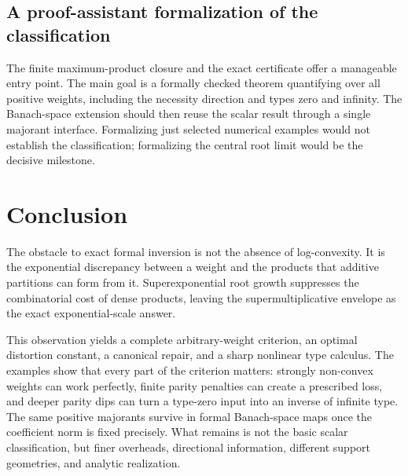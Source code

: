 \documentclass[11pt,a4paper]{article}
\numberwithin{equation}{section}
\theoremstyle{definition}
\theoremstyle{remark}
\begin{document}
\subsection{A proof-assistant formalization of the classification}

The finite maximum-product closure and the exact certificate offer a
manageable entry point. The main goal is a formally checked theorem
quantifying over all positive weights, including the necessity direction
and types zero and infinity. The Banach-space extension should then reuse
the scalar result through a single majorant interface. Formalizing just
selected numerical examples would not establish the classification;
formalizing the central root limit would be the decisive milestone.

\section*{Conclusion}

The obstacle to exact formal inversion is not the absence of
log-convexity. It is the exponential discrepancy between a weight and the
products that additive partitions can form from it. Superexponential root
growth suppresses the combinatorial cost of dense products, leaving the
supermultiplicative envelope as the exact exponential-scale answer.

This observation yields a complete arbitrary-weight criterion, an optimal
distortion constant, a canonical repair, and a sharp nonlinear type
calculus. The examples show that every part of the criterion matters:
strongly non-convex weights can work perfectly, finite parity penalties
can create a prescribed loss, and deeper parity dips can turn a
type-zero input into an inverse of infinite type. The same positive
majorants survive in formal Banach-space maps once the coefficient norm
is fixed precisely. What remains is not the basic scalar classification,
but finer overheads, directional information, different support geometries,
and analytic realization.
\end{document}
